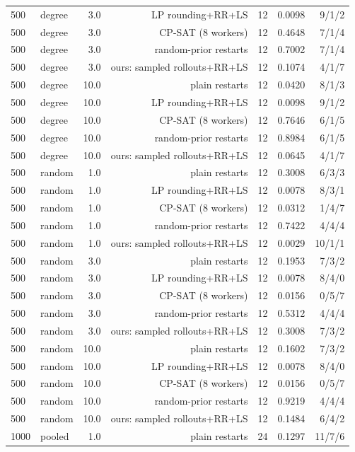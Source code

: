 \begin{table}[t]
\begin{tabular}{llrrrrr}
500 & degree & 3.0 & LP rounding+RR+LS & 12 & 0.0098 & 9/1/2 \\
500 & degree & 3.0 & CP-SAT (8 workers) & 12 & 0.4648 & 7/1/4 \\
500 & degree & 3.0 & random-prior restarts & 12 & 0.7002 & 7/1/4 \\
500 & degree & 3.0 & ours: sampled rollouts+RR+LS & 12 & 0.1074 & 4/1/7 \\
500 & degree & 10.0 & plain restarts & 12 & 0.0420 & 8/1/3 \\
500 & degree & 10.0 & LP rounding+RR+LS & 12 & 0.0098 & 9/1/2 \\
500 & degree & 10.0 & CP-SAT (8 workers) & 12 & 0.7646 & 6/1/5 \\
500 & degree & 10.0 & random-prior restarts & 12 & 0.8984 & 6/1/5 \\
500 & degree & 10.0 & ours: sampled rollouts+RR+LS & 12 & 0.0645 & 4/1/7 \\
500 & random & 1.0 & plain restarts & 12 & 0.3008 & 6/3/3 \\
500 & random & 1.0 & LP rounding+RR+LS & 12 & 0.0078 & 8/3/1 \\
500 & random & 1.0 & CP-SAT (8 workers) & 12 & 0.0312 & 1/4/7 \\
500 & random & 1.0 & random-prior restarts & 12 & 0.7422 & 4/4/4 \\
500 & random & 1.0 & ours: sampled rollouts+RR+LS & 12 & 0.0029 & 10/1/1 \\
500 & random & 3.0 & plain restarts & 12 & 0.1953 & 7/3/2 \\
500 & random & 3.0 & LP rounding+RR+LS & 12 & 0.0078 & 8/4/0 \\
500 & random & 3.0 & CP-SAT (8 workers) & 12 & 0.0156 & 0/5/7 \\
500 & random & 3.0 & random-prior restarts & 12 & 0.5312 & 4/4/4 \\
500 & random & 3.0 & ours: sampled rollouts+RR+LS & 12 & 0.3008 & 7/3/2 \\
500 & random & 10.0 & plain restarts & 12 & 0.1602 & 7/3/2 \\
500 & random & 10.0 & LP rounding+RR+LS & 12 & 0.0078 & 8/4/0 \\
500 & random & 10.0 & CP-SAT (8 workers) & 12 & 0.0156 & 0/5/7 \\
500 & random & 10.0 & random-prior restarts & 12 & 0.9219 & 4/4/4 \\
500 & random & 10.0 & ours: sampled rollouts+RR+LS & 12 & 0.1484 & 6/4/2 \\
1000 & pooled & 1.0 & plain restarts & 24 & 0.1297 & 11/7/6 \\

\end{tabular}
\end{table}
